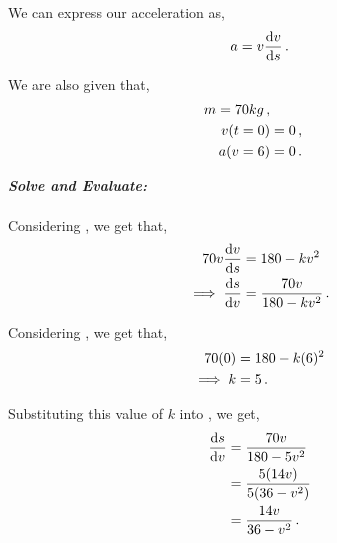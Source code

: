 \begin{subquestions}
We can express our acceleration as,
\begin{equation}
	a = v\frac{\mathrm{d}v}{\mathrm{d}s} \label{2006:q6:AEqn1} \,.
\end{equation}

We are also given that,
\begin{align}
	m=70kg \,, \nonumber \\
	v(t=0) & = 0 \,, \nonumber \\
	a(v=6) & = 0 \label{2006:q6:AEqn2} \,.
\end{align}





\textbf{\textit{Solve and Evaluate:}} \\ \\
Considering , we get that,
\begin{align}
	70v\frac{\mathrm{d}v}{\mathrm{d}s} & = 180-kv^2 \nonumber \\
	\implies \frac{\mathrm{d}s}{\mathrm{d}v} & = \frac{70v}{180-kv^2} \label{2006:q6:DEqn1} \,.
\end{align}

Considering , we get that,
\begin{align}
	70(0) & = 180 - k(6)^2 \nonumber \\
	\implies k & = 5  \,.
\end{align}

Substituting this value of $k$ into , we get,
\begin{align}
	\frac{\mathrm{d}s}{\mathrm{d}v} & = \frac{70v}{180-5v^2} \nonumber \\
	           & = \frac{5(14v)}{5(36-v^2)} \nonumber \\
	           & = \frac{14v}{36-v^2} \,.
\end{align} 

\end{subquestions}